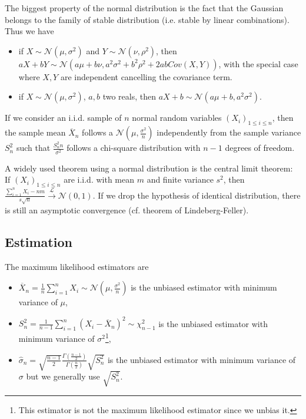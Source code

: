 The biggest property of the normal distribution is the fact that the Gaussian belongs to the family of stable distribution (i.e. stable by linear combinations). Thus we have
\begin{itemize}
\item if $X\sim \mathcal N(\mu, \sigma^2)$ and $Y\sim \mathcal N(\nu, \rho^2)$, then $aX+bY\sim\mathcal N(a\mu+b\nu, a^2\sigma^2+b^2\rho^2+2abCov(X,Y))$, with the special case where $X,Y$ are independent cancelling the covariance term.
\item if $X\sim \mathcal N(\mu, \sigma^2)$, $a,b$ two reals, then $aX+b\sim \mathcal N(a\mu+b, a^2\sigma^2)$.
\end{itemize}

If we consider an i.i.d. sample of $n$ normal random variables $(X_i)_{1\leq i\leq n}$, then the sample mean $\overline X_n$ follows a $\mathcal N(\mu, \frac{\sigma^2}{n})$ independently from the sample variance $S^2_n$ such that $\frac{S_n^2 n}{\sigma^2}$ follows a chi-square distribution with $n-1$ degrees of freedom.

A widely used theorem using a normal distribution is the central limit theorem:\\
If $(X_i)_{1\leq i\leq n}$ are i.i.d. with mean $m$ and finite variance $s^2$, then
$\frac{\sum_{i=1}^n X_i - nm}{s\sqrt{n}} \stackrel{\mathcal L}{\longrightarrow} \mathcal N(0,1)$. If we drop the hypothesis of identical distribution, there is still an asymptotic convergence (cf. theorem of Lindeberg-Feller).


\subsection{Estimation}
The maximum likelihood estimators are 
\begin{itemize}
\item $ \overline X_n = \frac{1}{n} \sum_{i=1}^n X_i \sim \mathcal N(\mu, \frac{\sigma^2}{n})$ is the unbiased estimator with minimum variance of $\mu$,
\item $S^2_n = \frac{1}{n-1} \sum_{i=1}^n (X_i- \overline X_n)^2 \sim \chi_{n-1}^2$ is the unbiased estimator with minimum variance of $\sigma^2$\footnote{This estimator is not the maximum likelihood estimator since we unbias it.},
\item $\hat \sigma_n = \sqrt{\frac{n-1}{2}}\frac{\Gamma(\frac{n-1}{2})}{\Gamma(\frac{n}{2})} \sqrt{S_n^2}$ is the unbiased estimator with minimum variance of $\sigma$ but we generally use $\sqrt{S_n^2}$.
\end{itemize}

